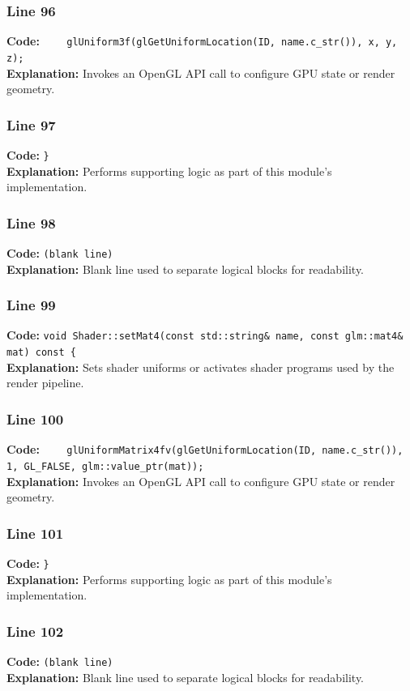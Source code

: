 \documentclass[11pt,a4paper]{article}
\begin{document}
\subsubsection*{Line 96}
\textbf{Code:} \verb|    glUniform3f(glGetUniformLocation(ID, name.c_str()), x, y, z);|\\
\textbf{Explanation:} Invokes an OpenGL API call to configure GPU state or render geometry.

\subsubsection*{Line 97}
\textbf{Code:} \verb|}|\\
\textbf{Explanation:} Performs supporting logic as part of this module's implementation.

\subsubsection*{Line 98}
\textbf{Code:} \texttt{(blank line)}\\
\textbf{Explanation:} Blank line used to separate logical blocks for readability.

\subsubsection*{Line 99}
\textbf{Code:} \verb|void Shader::setMat4(const std::string& name, const glm::mat4& mat) const {|\\
\textbf{Explanation:} Sets shader uniforms or activates shader programs used by the render pipeline.

\subsubsection*{Line 100}
\textbf{Code:} \verb|    glUniformMatrix4fv(glGetUniformLocation(ID, name.c_str()), 1, GL_FALSE, glm::value_ptr(mat));|\\
\textbf{Explanation:} Invokes an OpenGL API call to configure GPU state or render geometry.

\subsubsection*{Line 101}
\textbf{Code:} \verb|}|\\
\textbf{Explanation:} Performs supporting logic as part of this module's implementation.

\subsubsection*{Line 102}
\textbf{Code:} \texttt{(blank line)}\\
\textbf{Explanation:} Blank line used to separate logical blocks for readability.
\end{document}
